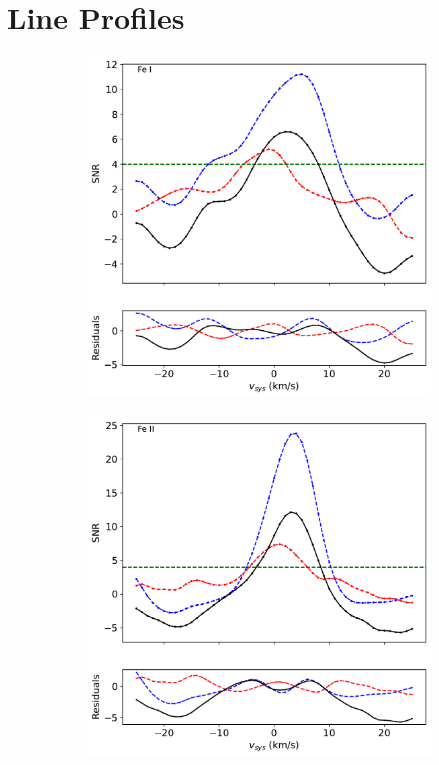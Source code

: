 \documentclass[twocolumn]{aastex631}
\begin{document}
        \section{Line Profiles}
            \begin{figure}[ht!]\label{fig:line-profle-overlaid-arms}
                \begin{subfigure}[b]{0.3\textwidth}
                    \centering
                    \includegraphics[width=\textwidth]{plots-updated/line-profile-overlaidarms/KELT-20b.20190504.combined.Fe I.line-profiles-overlaidarms.pdf}
                \end{subfigure}
                \begin{subfigure}[b]{0.3\textwidth}
                    \centering
                    \includegraphics[width=\textwidth]{plots-updated/line-profile-overlaidarms/KELT-20b.20190504.combined.Fe II.line-profiles-overlaidarms.pdf}

\end{subfigure}
\end{figure}
\end{document}
